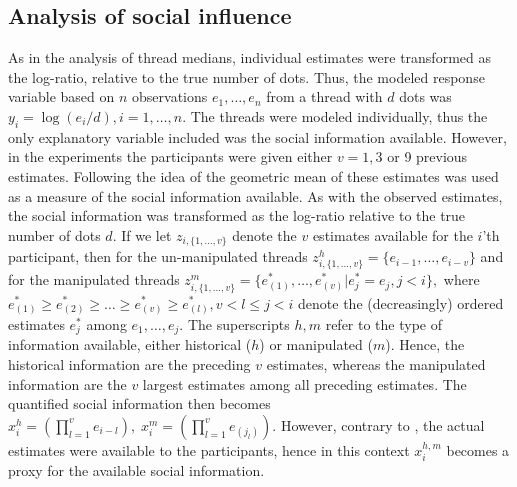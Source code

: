 \documentclass[9pt,twocolumn,twoside,lineno]{pnas-new}
\begin{document}
{\subsection*{Analysis of social influence}
As in the analysis of thread medians, individual estimates were transformed as the log-ratio, relative to the true number of dots. Thus, the modeled response variable based on $n$ observations $e_1,\dots,e_n$ from a thread with $d$ dots was $y_i = \log(e_i/d), i=1,\dots,n$. The threads were modeled individually, thus the only explanatory variable included was the social information available. However, in the experiments the participants were given either $v=1, 3$ or 9 previous estimates. Following the idea of \citep{jayles2017social} the geometric mean of these estimates was used as a measure of the social information available. As with the observed estimates, the social information was transformed as the log-ratio relative to the true number of dots $d$. If we let $z_{i,\{1,\dots,v\}}$ denote the $v$ estimates available for the $i$'th participant, then for the un-manipulated threads 
$
	z^h_{i, \{1,\dots,v\}} = \{e_{i-1},\dots,e_{i-v}\}
$
and for the manipulated threads
$
	z^m_{i, \{1,\dots,v\}} = \{e^*_{(1)},\dots,e^*_{(v)} | e^*_j=e_j, j<i\},
$
where $e^*_{(1)}\geq e^*_{(2)}\geq\dots\geq e^*_{(v)}\geq e^*_{(l)}, v<l\leq j<i$ denote the (decreasingly) ordered estimates $e^*_j$ among $e_1,\dots,e_j$. The superscripts $h,m$ refer to the type of information available, either historical ($h$) or manipulated ($m$). Hence, the historical information are the preceding $v$ estimates, whereas the manipulated information are the $v$ largest estimates among all preceding estimates. The quantified social information then becomes
$
	x_i^h = \left(\prod_{l=1}^v e_{i-l} \right), \;
	x_i^m = \left(\prod_{l=1}^v e_{(j_l)} \right).
$
However, contrary to \citep{jayles2017social}, the actual estimates were available to the participants, hence in this context $x_i^{h,m}$ becomes a proxy for the available social information. %
}
\end{document}
